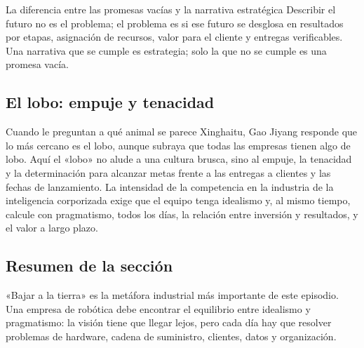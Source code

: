 \begin{importantbox}{La diferencia entre las promesas vacías y la narrativa estratégica}
Describir el futuro no es el problema; el problema es si ese futuro se desglosa en resultados por etapas, asignación de recursos, valor para el cliente y entregas verificables. Una narrativa que se cumple es estrategia; solo la que no se cumple es una promesa vacía.
\end{importantbox}

\subsection{El lobo: empuje y tenacidad}

Cuando le preguntan a qué animal se parece Xinghaitu, Gao Jiyang responde que lo más cercano es el lobo, aunque subraya que todas las empresas tienen algo de lobo. Aquí el «lobo» no alude a una cultura brusca, sino al empuje, la tenacidad y la determinación para alcanzar metas frente a las entregas a clientes y las fechas de lanzamiento. La intensidad de la competencia en la industria de la inteligencia corporizada exige que el equipo tenga idealismo y, al mismo tiempo, calcule con pragmatismo, todos los días, la relación entre inversión y resultados, y el valor a largo plazo.

\subsection{Resumen de la sección}

«Bajar a la tierra» es la metáfora industrial más importante de este episodio. Una empresa de robótica debe encontrar el equilibrio entre idealismo y pragmatismo: la visión tiene que llegar lejos, pero cada día hay que resolver problemas de hardware, cadena de suministro, clientes, datos y organización.
